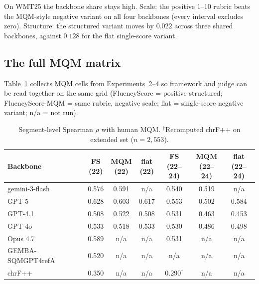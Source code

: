 \documentclass[11pt]{article}
\newcommand{\FS}{FluencyScore}
\begin{document}
On WMT25 the backbone share stays high.
Scale: the positive 1--10 rubric beats the MQM-style negative variant on all four
backbones (every interval excludes zero).
Structure: the structured variant moves by $0.022$ across three shared backbones,
against $0.128$ for the flat single-score variant.

\subsection{The full MQM matrix}
Table~\ref{tab:7e} collects MQM cells from Experiments~2--4 so framework and
judge can be read together on the same grid
(\FS{} = positive structured; FluencyScore-MQM = same rubric, negative scale;
flat = single-score negative variant; n/a = not run).

\begin{table}[t]
\centering
\scriptsize
\setlength{\tabcolsep}{1.5pt}

\caption{Segment-level Spearman $\rho$ with human MQM. $^\dagger$Recomputed chrF++ on extended set ($n{=}2{,}553$).}
\label{tab:7e}

\begin{tabularx}{\columnwidth}{>{\raggedright\arraybackslash}Xcccccc}
\toprule
Backbone & \shortstack{FS\\(22)} & \shortstack{MQM\\(22)} & \shortstack{flat\\(22)} & \shortstack{FS\\(22--24)} & \shortstack{MQM\\(22--24)} & \shortstack{flat\\(22--24)} \\
\midrule
gemini-3-flash & 0.576 & 0.591 & n/a & 0.540 & 0.519 & n/a \\
GPT-5 & 0.628 & 0.603 & 0.617 & 0.553 & 0.502 & 0.584 \\
GPT-4.1 & 0.508 & 0.522 & 0.508 & 0.531 & 0.463 & 0.453 \\
GPT-4o & 0.533 & 0.518 & 0.533 & 0.530 & 0.486 & 0.498 \\
Opus 4.7 & 0.589 & n/a & n/a & 0.531 & n/a & n/a \\
GEMBA-SQM\-GPT4\-refA & 0.520 & n/a & n/a & n/a & n/a & n/a \\
chrF++ & 0.350 & n/a & n/a & 0.290$^\dagger$ & n/a & n/a \\
\bottomrule
\end{tabularx}

\end{table}
\end{document}
